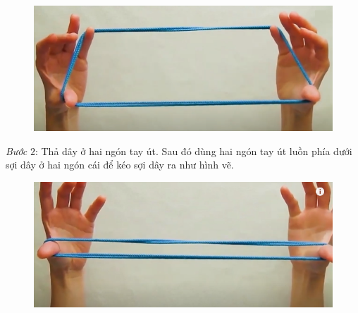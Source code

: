\begin{multicols}{2}
\begin{figure}[H]
		\vspace*{1pt}
		\includegraphics[width=1\linewidth]{1c}
		\vspace*{-10pt}
	\end{figure}
	\textit{Bước} $2$: Thả dây ở hai ngón tay út. Sau đó dùng hai ngón tay út luồn phía dưới sợi dây ở hai ngón cái để kéo sợi dây ra như hình vẽ.
	\begin{figure}[H]
		\vspace*{5pt}
		\centering
		\captionsetup{labelformat= empty, justification=centering}
		\includegraphics[width=0.98\linewidth]{2a}
		

\end{figure}
\end{multicols}
